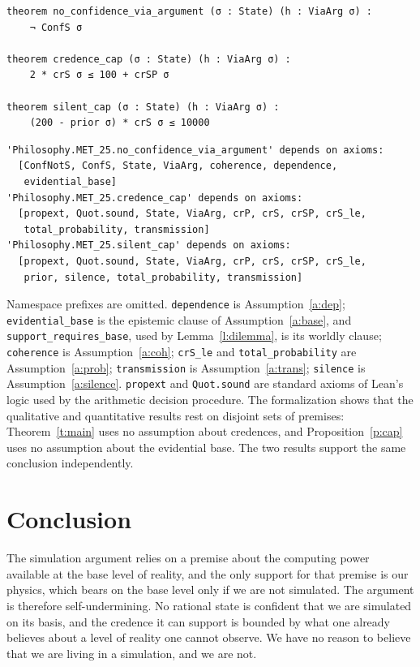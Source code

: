 \documentclass{situationist-preprint}
\begin{document}
\begin{lstlisting}
theorem no_confidence_via_argument (σ : State) (h : ViaArg σ) :
    ¬ ConfS σ

theorem credence_cap (σ : State) (h : ViaArg σ) :
    2 * crS σ ≤ 100 + crSP σ

theorem silent_cap (σ : State) (h : ViaArg σ) :
    (200 - prior σ) * crS σ ≤ 10000
\end{lstlisting}

\begin{lstlisting}
'Philosophy.MET_25.no_confidence_via_argument' depends on axioms:
  [ConfNotS, ConfS, State, ViaArg, coherence, dependence,
   evidential_base]
'Philosophy.MET_25.credence_cap' depends on axioms:
  [propext, Quot.sound, State, ViaArg, crP, crS, crSP, crS_le,
   total_probability, transmission]
'Philosophy.MET_25.silent_cap' depends on axioms:
  [propext, Quot.sound, State, ViaArg, crP, crS, crSP, crS_le,
   prior, silence, total_probability, transmission]
\end{lstlisting}

Namespace prefixes are omitted. \texttt{dependence} is Assumption~\ref{a:dep}; \texttt{evidential\_base} is the epistemic clause of Assumption~\ref{a:base}, and \texttt{support\_requires\_base}, used by Lemma~\ref{l:dilemma}, is its worldly clause; \texttt{coherence} is Assumption~\ref{a:coh}; \texttt{crS\_le} and \texttt{total\_probability} are Assumption~\ref{a:prob}; \texttt{transmission} is Assumption~\ref{a:trans}; \texttt{silence} is Assumption~\ref{a:silence}. \texttt{propext} and \texttt{Quot.sound} are standard axioms of Lean's logic used by the arithmetic decision procedure. The formalization shows that the qualitative and quantitative results rest on disjoint sets of premises: Theorem~\ref{t:main} uses no assumption about credences, and Proposition~\ref{p:cap} uses no assumption about the evidential base. The two results support the same conclusion independently.

\section{Conclusion}

The simulation argument relies on a premise about the computing power available at the base level of reality, and the only support for that premise is our physics, which bears on the base level only if we are not simulated. The argument is therefore self-undermining. No rational state is confident that we are simulated on its basis, and the credence it can support is bounded by what one already believes about a level of reality one cannot observe. We have no reason to believe that we are living in a simulation, and we are not.
\end{document}
